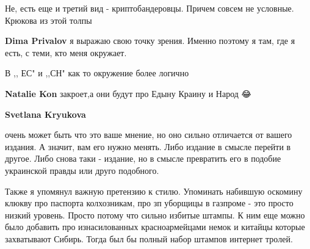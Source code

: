 \begin{itemize}
\begin{itemize}
 
Не, есть еще и третий вид - криптобандеровцы. Причем совсем не условные. Крюкова из этой толпы \Laughey[1.0][white]


 
\textbf{Dima Privalov} я выражаю свою точку зрения. Именно поэтому я там, где я есть, с теми, кто меня окружает.

 
В ,, ЕС" и ,,СН" как то окружение более логично

 
\textbf{Natalie Kon} закроет,а они будут про Едыну Краину и Народ 😂

 
\textbf{Svetlana Kryukova} 

очень может быть что это ваше мнение, но оно сильно отличается от вашего
издания. А значит, вам его нужно менять. Либо издание в смысле перейти в
другое. Либо снова таки - издание, но в смысле превратить его в подобие
украинской правды или друго подобного.

Также я упомянул важную претензию к стилю. Упоминать набившую оскомину клюкву
про паспорта колхозникам, про зп уборщицы в газпроме - это просто низкий
уровень. Просто потому что сильно избитые штампы. К ним еще можно было добавить
про изнасилованных красноармейцами немок и китайцы которые захватывают Сибирь.
Тогда был бы полный набор штампов интернет тролей.


\end{itemize}
\end{itemize}
